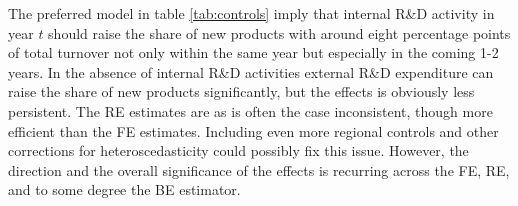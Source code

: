 \label{sec:conclusion}
The preferred model in table \ref{tab:controls} imply that internal R\&D activity in year $t$ should raise the share of new products with around eight percentage points of total turnover not only within the same year but especially in the coming 1-2 years. In the absence of internal R\&D activities external R\&D expenditure can raise the share of new products significantly, but the effects is obviously less persistent. The RE estimates are as is often the case inconsistent, though more efficient than the FE estimates. Including even more regional controls and other corrections for heteroscedasticity could possibly fix this issue. However, the direction and the overall significance of the effects is recurring across the FE, RE, and to some degree the BE estimator.
